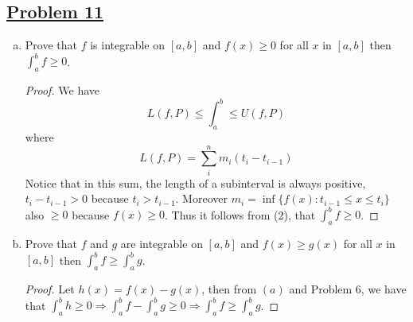 \documentclass[10pt,letterpaper]{article}
\begin{document}
	\subsection*{{\color{purple}\underline{Problem 11}}}
	\text{ }
	\begin{enumerate}[(a)]
		\item Prove that $f$ is integrable on $[a, b]$ and $f(x) \geq 0$ for all $x$ 
		in $[a, b]$ then $\displaystyle\int_{a}^{b} f \geq 0$.
		\begin{proof}
		We have
		\begin{equation*}
		L(f, P) \leq \displaystyle\int_{a}^{b} \leq U(f, P)
		\end{equation*}
		where 
		$$L(f, P) = \displaystyle\sum_{i}^{n} m_i(t_{i} - t_{i-1})$$
		Notice that in this sum, the length of a subinterval is always positive, $t_i - t_{i-1} > 0$
		because $t_i > t_{i-1}$. Moreover $m_i = \inf\{f(x) : t_{i-1} \leq x \leq t_i\}$ also $\geq 0$
		because $f(x) \geq 0$. Thus it follows from (2), that $\displaystyle\int_{a}^{b} f \geq 0$.
		\end{proof}
		
		\item Prove that $f$ and $g$ are integrable on $[a, b]$ and $f(x) \geq g(x)$ for 
		all $x$ in $[a, b]$ then $\displaystyle\int_{a}^{b} f \geq \displaystyle\int_{a}^{b} g$.
		\begin{proof}
		Let $h(x) = f(x) - g(x)$, then from $(a)$ and Problem 6, we have that $\displaystyle\int_{a}^{b} h \geq 0
		\Rightarrow \displaystyle\int_{a}^{b} f - \displaystyle\int_{a}^{b} g \geq 0 \Rightarrow
		\displaystyle\int_{a}^{b} f \geq \displaystyle\int_{a}^{b} g$.
		\end{proof}
	\end{enumerate}
	
	
\end{document}
